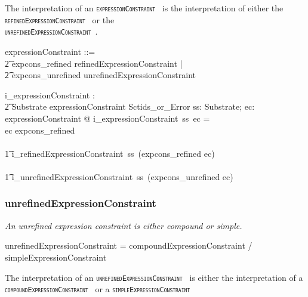 \documentclass{article}
\def\spec#1{{\tt \small \textsc{{#1}} }}
\def\bnf#1{{\scriptsize {{#1}} }}
\def\desc#1{{\small \textsl{{#1}} }}
\begin{document}
The interpretation of an \spec{expressionConstraint} is the interpretation of either the  \spec{refinedExpressionConstraint} or the \\ \spec{unrefinedExpressionConstraint}.

\begin{zed}
expressionConstraint ::= \\
\t2 expcons\_refined \ldata refinedExpressionConstraint \rdata | \\
\t2 expcons\_unrefined \ldata unrefinedExpressionConstraint \rdata \\
\end{zed}


\begin{axdef}
   i\_expressionConstraint : \\
\t2 Substrate \fun expressionConstraint \fun Sctids\_or\_Error
\where
   \forall ss: Substrate; ec: expressionConstraint @ i\_expressionConstraint~ss~ec = \\
   \IF ec \in \ran expcons\_refined  \\
\THEN \\
\t1 i\_refinedExpressionConstraint~ss~(expcons\_refined \inv ec) \\
   \ELSE \\
\t1 i\_unrefinedExpressionConstraint~ss~(expcons\_unrefined \inv ec) 
\end{axdef}

\subsubsection{unrefinedExpressionConstraint}
\begin{framed}
\desc{An unrefined expression constraint is either compound or simple.}
\end{framed}
\begin{framed}
\noindent
\bnf{unrefinedExpressionConstraint = compoundExpressionConstraint / simpleExpressionConstraint}
\end{framed}

The interpretation of an \spec{unrefinedExpressionConstraint} is either the interpretation of a \spec{compoundExpressionConstraint} or a \spec{simpleExpressionConstraint}
\end{document}

